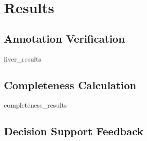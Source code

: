 \chapter{Results}

\section{Annotation Verification}
{liver_results}

\clearpage
\section{Completeness Calculation}
{completeness_results}

\clearpage
\section{Decision Support Feedback}